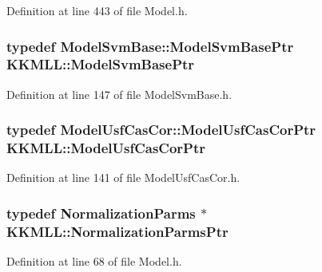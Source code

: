 Definition at line 443 of file Model.\+h.

\subsubsection[{\texorpdfstring{Model\+Svm\+Base\+Ptr}{ModelSvmBasePtr}}]{\setlength{\rightskip}{0pt plus 5cm}typedef {\bf Model\+Svm\+Base\+::\+Model\+Svm\+Base\+Ptr} {\bf K\+K\+M\+L\+L\+::\+Model\+Svm\+Base\+Ptr}}\hypertarget{namespace_k_k_m_l_l_aabc14867c1482abadc9ad33e5ae16a27}{}\label{namespace_k_k_m_l_l_aabc14867c1482abadc9ad33e5ae16a27}


Definition at line 147 of file Model\+Svm\+Base.\+h.

\subsubsection[{\texorpdfstring{Model\+Usf\+Cas\+Cor\+Ptr}{ModelUsfCasCorPtr}}]{\setlength{\rightskip}{0pt plus 5cm}typedef {\bf Model\+Usf\+Cas\+Cor\+::\+Model\+Usf\+Cas\+Cor\+Ptr} {\bf K\+K\+M\+L\+L\+::\+Model\+Usf\+Cas\+Cor\+Ptr}}\hypertarget{namespace_k_k_m_l_l_aa418dbdba2899ad356b794adc968e404}{}\label{namespace_k_k_m_l_l_aa418dbdba2899ad356b794adc968e404}


Definition at line 141 of file Model\+Usf\+Cas\+Cor.\+h.

\subsubsection[{\texorpdfstring{Normalization\+Parms\+Ptr}{NormalizationParmsPtr}}]{\setlength{\rightskip}{0pt plus 5cm}typedef {\bf Normalization\+Parms} $\ast$ {\bf K\+K\+M\+L\+L\+::\+Normalization\+Parms\+Ptr}}\hypertarget{namespace_k_k_m_l_l_a398d05517609c333aaf415007f713d79}{}\label{namespace_k_k_m_l_l_a398d05517609c333aaf415007f713d79}


Definition at line 68 of file Model.\+h.

